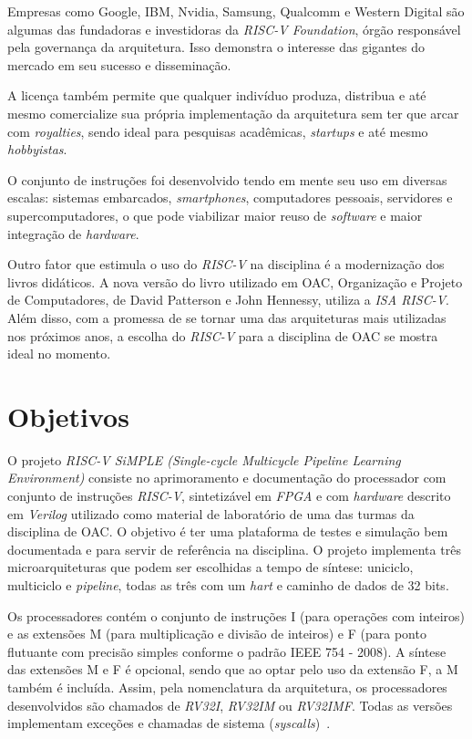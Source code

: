 { Empresas como Google, IBM, Nvidia, Samsung, Qualcomm e Western Digital são
    algumas das fundadoras e investidoras da \textit{RISC-V Foundation}, órgão
    responsável pela governança da arquitetura. Isso demonstra o interesse das
    gigantes do mercado em seu sucesso e disseminação.
}

{ A licença também permite que qualquer indivíduo produza, distribua e
    até mesmo comercialize sua própria implementação da arquitetura sem ter
    que arcar com \textit{royalties}, sendo ideal para pesquisas acadêmicas,
    \textit{startups} e até mesmo \textit{hobbyistas}.
}

{ O conjunto de instruções foi desenvolvido tendo em mente seu uso em
    diversas escalas: sistemas embarcados, \textit{smartphones},
    computadores pessoais, servidores e supercomputadores, o que pode viabilizar
    maior reuso de \textit{software} e maior integração de
    \textit{hardware}.
}

{ Outro fator que estimula o uso do \textit{RISC-V} na disciplina é a modernização
    dos livros didáticos. A nova versão do livro utilizado em OAC, Organização
    e Projeto de Computadores, de David Patterson e John Hennessy, utiliza
    a \textit{ISA RISC-V}. Além disso, com a promessa de se tornar uma das
    arquiteturas mais utilizadas nos próximos anos, a escolha do \textit{RISC-V}
    para a disciplina de OAC se mostra ideal no momento.
}

\section{Objetivos}
{ O projeto \textit{RISC-V SiMPLE (Single-cycle Multicycle Pipeline Learning
    Environment)} consiste no aprimoramento e documentação do processador com
    conjunto de instruções \textit{RISC-V}, sintetizável em \textit{FPGA} e com
    \textit{hardware} descrito em \textit{Verilog} utilizado como material de
    laboratório de uma das turmas da disciplina de OAC. O objetivo é ter uma
    plataforma de testes e simulação bem documentada e para servir de referência
    na disciplina. O projeto implementa três microarquiteturas que podem ser
    escolhidas a tempo de síntese: uniciclo, multiciclo e \textit{pipeline},
    todas as três com um \textit{hart} e caminho de dados de 32 bits.
}

{ Os processadores contém o conjunto de instruções I (para operações com
    inteiros) e as extensões M (para multiplicação e divisão de inteiros) e F
    (para ponto flutuante com precisão simples conforme o padrão IEEE 754 - 2008).
    A síntese das extensões M e F é opcional, sendo que ao optar pelo uso da
    extensão F, a M também é incluída. Assim, pela nomenclatura da arquitetura,
    os processadores desenvolvidos são chamados de \textit{RV32I}, \textit{RV32IM}
    ou \textit{RV32IMF}. Todas as versões implementam exceções e chamadas de sistema
    (\textit{syscalls})~\cite{riscv_spec2}.
}


